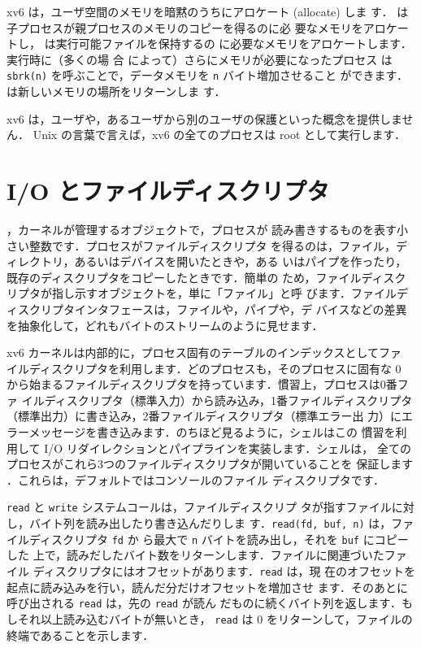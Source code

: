 xv6 は，ユーザ空間のメモリを暗黙のうちにアロケート (allocate) しま
す． は子プロセスが親プロセスのメモリのコピーを得るのに必
要なメモリをアロケートし， は実行可能ファイルを保持するの
に必要なメモリをアロケートします．実行時に（多くの場
合 によって）さらにメモリが必要になったプロセス
は \lstinline{sbrk(n)} を呼ぶことで，データメモリを \lstinline{n} バイト増加させること
ができます． は新しいメモリの場所をリターンしま
す．

xv6 は，ユーザや，あるユーザから別のユーザの保護といった概念を提供しません．
Unix の言葉で言えば，xv6 の全てのプロセスは root として実行します．

\section{I/O とファイルディスクリプタ}

，カーネルが管理するオブジェクトで，プロセスが
読み書きするものを表す小さい整数です．プロセスがファイルディスクリプタ
を得るのは，ファイル，ディレクトリ，あるいはデバイスを開いたときや，ある
いはパイプを作ったり，既存のディスクリプタをコピーしたときです．簡単の
ため，ファイルディスクリプタが指し示すオブジェクトを，単に「ファイル」と呼
びます．ファイルディスクリプタインタフェースは，ファイルや，パイプや，デ
バイスなどの差異を抽象化して，どれもバイトのストリームのように見せます．


xv6 カーネルは内部的に，プロセス固有のテーブルのインデックスとしてファ
イルディスクリプタを利用します．どのプロセスも，そのプロセスに固有な 0
から始まるファイルディスクリプタを持っています．慣習上，プロセスは0番ファ
イルディスクリプタ（標準入力）から読み込み，1番ファイルディスクリプタ
（標準出力）に書き込み，2番ファイルディスクリプタ（標準エラー出
力）にエラーメッセージを書き込みます．のちほど見るように，シェルはこの
慣習を利用して I/O リダイレクションとパイプラインを実装します．シェルは，
全てのプロセスがこれら3つのファイルディスクリプタが開いていることを
保証します ．これらは，デフォルトではコンソールのファイル
ディスクリプタです．


\lstinline{read} と \lstinline{write} システムコールは，ファイルディスクリプ
タが指すファイルに対し，バイト列を読み出したり書き込んだりしま
す．\lstinline{read(fd, buf, n)} は，ファイルディスクリプタ \lstinline{fd} か
ら最大で \lstinline{n} バイトを読み出し，それを \lstinline{buf} にコピーした
上で，読みだしたバイト数をリターンします．ファイルに関連づいたファイル
ディスクリプタにはオフセットがあります．\lstinline{read} は，現
在のオフセットを起点に読み込みを行い，読んだ分だけオフセットを増加させ
ます．そのあとに呼び出される \lstinline{read} は，先の \lstinline{read} が読ん
だものに続くバイト列を返します．もしそれ以上読み込むバイトが無いとき，
\lstinline{read} は 0 をリターンして，ファイルの終端であることを示します．

